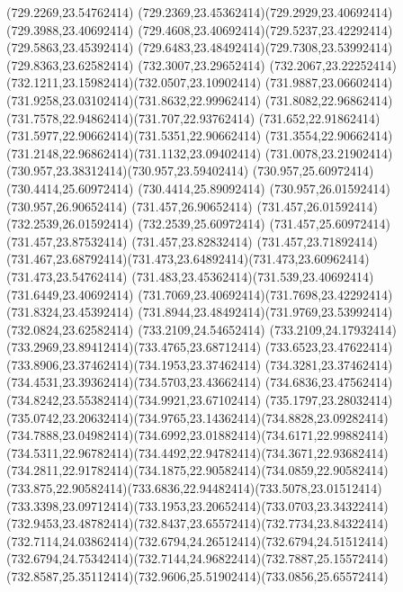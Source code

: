 {{	\lineto(729.2269,23.54762414)
	\curveto(729.2369,23.45362414)(729.2929,23.40692414)(729.3988,23.40692414)
	\curveto(729.4608,23.40692414)(729.5237,23.42292414)(729.5863,23.45392414)
	\curveto(729.6483,23.48492414)(729.7308,23.53992414)(729.8363,23.62582414)
	\closepath
	\moveto(732.3007,23.29652414)
	\curveto(732.2067,23.22252414)(732.1211,23.15982414)(732.0507,23.10902414)
	\curveto(731.9887,23.06602414)(731.9258,23.03102414)(731.8632,22.99962414)
	\curveto(731.8082,22.96862414)(731.7578,22.94862414)(731.707,22.93762414)
	\curveto(731.652,22.91862414)(731.5977,22.90662414)(731.5351,22.90662414)
	\curveto(731.3554,22.90662414)(731.2148,22.96862414)(731.1132,23.09402414)
	\curveto(731.0078,23.21902414)(730.957,23.38312414)(730.957,23.59402414)
	\lineto(730.957,25.60972414)
	\lineto(730.4414,25.60972414)
	\lineto(730.4414,25.89092414)
	\lineto(730.957,26.01592414)
	\lineto(730.957,26.90652414)
	\lineto(731.457,26.90652414)
	\lineto(731.457,26.01592414)
	\lineto(732.2539,26.01592414)
	\lineto(732.2539,25.60972414)
	\lineto(731.457,25.60972414)
	\lineto(731.457,23.87532414)
	\lineto(731.457,23.82832414)
	\lineto(731.457,23.71892414)
	\curveto(731.467,23.68792414)(731.473,23.64892414)(731.473,23.60962414)
	\lineto(731.473,23.54762414)
	\curveto(731.483,23.45362414)(731.539,23.40692414)(731.6449,23.40692414)
	\curveto(731.7069,23.40692414)(731.7698,23.42292414)(731.8324,23.45392414)
	\curveto(731.8944,23.48492414)(731.9769,23.53992414)(732.0824,23.62582414)
	\closepath
	\moveto(733.2109,24.54652414)
	\curveto(733.2109,24.17932414)(733.2969,23.89412414)(733.4765,23.68712414)
	\curveto(733.6523,23.47622414)(733.8906,23.37462414)(734.1953,23.37462414)
	\curveto(734.3281,23.37462414)(734.4531,23.39362414)(734.5703,23.43662414)
	\curveto(734.6836,23.47562414)(734.8242,23.55382414)(734.9921,23.67102414)
	\lineto(735.1797,23.28032414)
	\curveto(735.0742,23.20632414)(734.9765,23.14362414)(734.8828,23.09282414)
	\curveto(734.7888,23.04982414)(734.6992,23.01882414)(734.6171,22.99882414)
	\curveto(734.5311,22.96782414)(734.4492,22.94782414)(734.3671,22.93682414)
	\curveto(734.2811,22.91782414)(734.1875,22.90582414)(734.0859,22.90582414)
	\curveto(733.875,22.90582414)(733.6836,22.94482414)(733.5078,23.01512414)
	\curveto(733.3398,23.09712414)(733.1953,23.20652414)(733.0703,23.34322414)
	\curveto(732.9453,23.48782414)(732.8437,23.65572414)(732.7734,23.84322414)
	\curveto(732.7114,24.03862414)(732.6794,24.26512414)(732.6794,24.51512414)
	\curveto(732.6794,24.75342414)(732.7144,24.96822414)(732.7887,25.15572414)
	\curveto(732.8587,25.35112414)(732.9606,25.51902414)(733.0856,25.65572414)
}}
